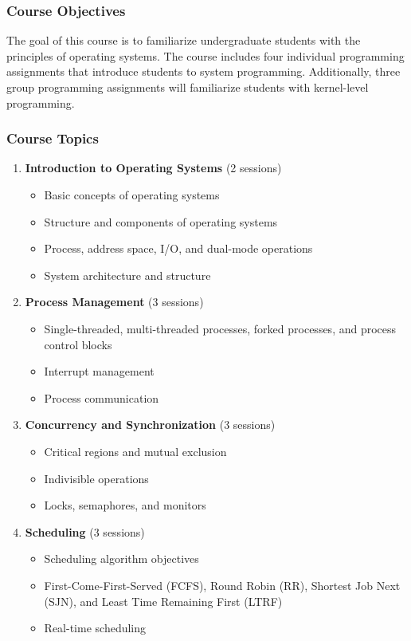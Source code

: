 \documentclass[12pt]{article}
\begin{document}
\subsubsection*{Course Objectives}
The goal of this course is to familiarize undergraduate students with the principles of operating systems. The course includes four individual programming assignments that introduce students to system programming. Additionally, three group programming assignments will familiarize students with kernel-level programming.

\subsubsection*{Course Topics}
\begin{enumerate}
    \item \textbf{Introduction to Operating Systems} (2 sessions)
    \begin{itemize}
        \item Basic concepts of operating systems
        \item Structure and components of operating systems
        \item Process, address space, I/O, and dual-mode operations
        \item System architecture and structure
    \end{itemize}
    
    \item \textbf{Process Management} (3 sessions)
    \begin{itemize}
        \item Single-threaded, multi-threaded processes, forked processes, and process control blocks
        \item Interrupt management
        \item Process communication
    \end{itemize}

    \item \textbf{Concurrency and Synchronization} (3 sessions)
    \begin{itemize}
        \item Critical regions and mutual exclusion
        \item Indivisible operations
        \item Locks, semaphores, and monitors
    \end{itemize}
    
    \item \textbf{Scheduling} (3 sessions)
    \begin{itemize}
        \item Scheduling algorithm objectives
        \item First-Come-First-Served (FCFS), Round Robin (RR), Shortest Job Next (SJN), and Least Time Remaining First (LTRF)
        \item Real-time scheduling
    \end{itemize}


\end{enumerate}
\end{document}
